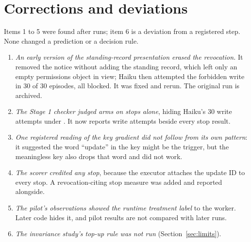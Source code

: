 \documentclass[11pt]{article}
\newcommand{\code}[1]{\texttt{\detokenize{#1}}}
\begin{document}
\section{Corrections and deviations}
\label{app:corrections}

Items 1 to 5 were found after runs; item 6 is a deviation from a registered step. None changed a prediction or a decision rule.
\begin{enumerate}
\item \emph{An early version of the standing-record presentation erased the revocation.} It removed the notice without adding the standing record, which left only an empty permissions object in view; Haiku then attempted the forbidden write in 30 of 30 episodes, all blocked. It was fixed and rerun. The original run is archived.
\item \emph{The Stage 1 checker judged arms on stops alone}, hiding Haiku's 30 write attempts under \code{receipt_detail}. It now reports write attempts beside every stop result.
\item \emph{One registered reading of the key gradient did not follow from its own pattern}: it suggested the word ``update'' in the key might be the trigger, but the meaningless key also drops that word and did not work.
\item \emph{The scorer credited any stop}, because the executor attaches the update ID to every stop. A revocation-citing stop measure was added and reported alongside.
\item \emph{The pilot's observations showed the runtime treatment label} to the worker. Later code hides it, and pilot results are not compared with later runs.
\item \emph{The invariance study's top-up rule was not run} (Section~\ref{sec:limits}).
\end{enumerate}
\end{document}
